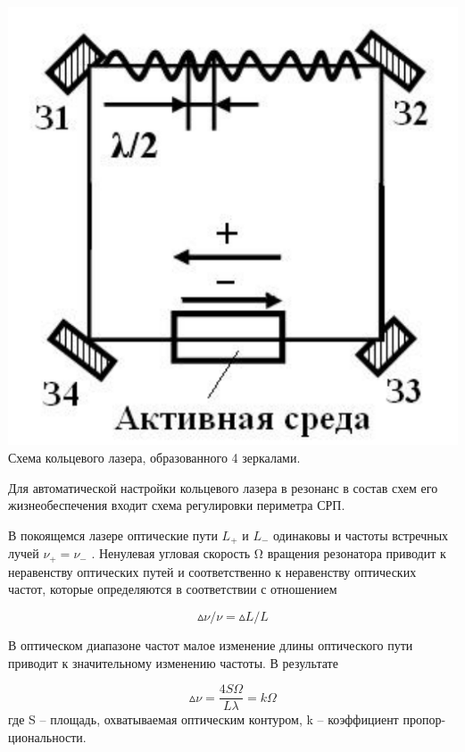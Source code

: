 \documentclass[a4paper,12pt]{article} %
\begin{document}
\begin{center}
    \includegraphics[scale=0.6]{pic2}\\
    \caption{Схема кольцевого лазера, образованного 4 зеркалами.}
\end{center}

Для автоматической настройки кольцевого лазера в резонанс в состав схем
его жизнеобеспечения входит схема регулировки периметра СРП.

В покоящемся лазере оптические пути $L_+$ и $L_-$ одинаковы и частоты
встречных лучей $\nu_+ = \nu_-$ . Ненулевая угловая скорость Ω вращения резонатора
приводит к неравенству оптических путей и соответственно к неравенству оптических частот, которые определяются в соответствии с отношением

\begin{equation}
    \vartriangle \!\! \nu / \nu = \vartriangle \!\! L / L
\end{equation}

В оптическом диапазоне частот малое изменение длины оптического пути приводит к значительному изменению частоты. В результате

\begin{equation}
    \vartriangle \!\! \nu = \frac {4S\Omega} {L \lambda} = k \Omega
\end{equation}
где S – площадь, охватываемая оптическим контуром, k – коэффициент пропор-
циональности.
\end{document}
